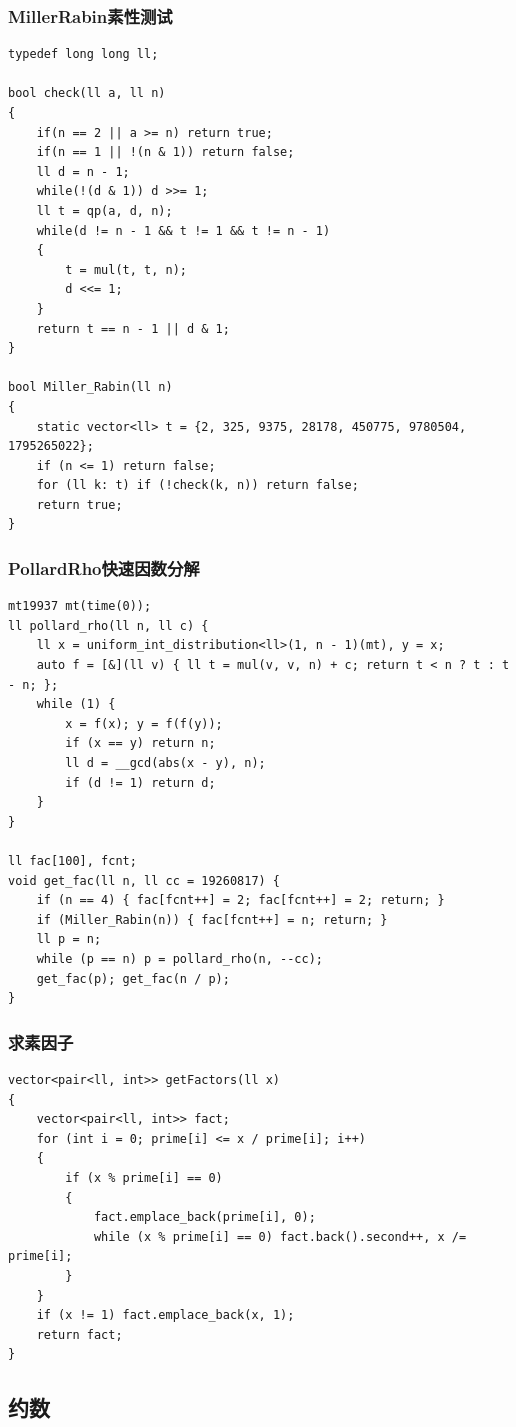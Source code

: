 \documentclass[twoside]{article}
\begin{document}
\subsubsection{MillerRabin素性测试}
\begin{lstlisting}
typedef long long ll;

bool check(ll a, ll n)
{
    if(n == 2 || a >= n) return true;
    if(n == 1 || !(n & 1)) return false;
    ll d = n - 1;
    while(!(d & 1)) d >>= 1;
    ll t = qp(a, d, n);
    while(d != n - 1 && t != 1 && t != n - 1)
    {
        t = mul(t, t, n);
        d <<= 1;
    } 
    return t == n - 1 || d & 1;
}

bool Miller_Rabin(ll n)
{
    static vector<ll> t = {2, 325, 9375, 28178, 450775, 9780504, 1795265022};
    if (n <= 1) return false;
    for (ll k: t) if (!check(k, n)) return false;
    return true;
}\end{lstlisting}
\subsubsection{PollardRho快速因数分解}
\begin{lstlisting}
mt19937 mt(time(0));
ll pollard_rho(ll n, ll c) {
    ll x = uniform_int_distribution<ll>(1, n - 1)(mt), y = x;
    auto f = [&](ll v) { ll t = mul(v, v, n) + c; return t < n ? t : t - n; };
    while (1) {
        x = f(x); y = f(f(y));
        if (x == y) return n;
        ll d = __gcd(abs(x - y), n);
        if (d != 1) return d;
    }
}

ll fac[100], fcnt;
void get_fac(ll n, ll cc = 19260817) {
    if (n == 4) { fac[fcnt++] = 2; fac[fcnt++] = 2; return; }
    if (Miller_Rabin(n)) { fac[fcnt++] = n; return; }
    ll p = n;
    while (p == n) p = pollard_rho(n, --cc);
    get_fac(p); get_fac(n / p);
}\end{lstlisting}
\subsubsection{求素因子}
\begin{lstlisting}
vector<pair<ll, int>> getFactors(ll x)
{
    vector<pair<ll, int>> fact;
    for (int i = 0; prime[i] <= x / prime[i]; i++)
    {
        if (x % prime[i] == 0)
        {
            fact.emplace_back(prime[i], 0);
            while (x % prime[i] == 0) fact.back().second++, x /= prime[i];
        }
    }
    if (x != 1) fact.emplace_back(x, 1);
    return fact;
}\end{lstlisting}
\subsection{约数}
\end{document}
